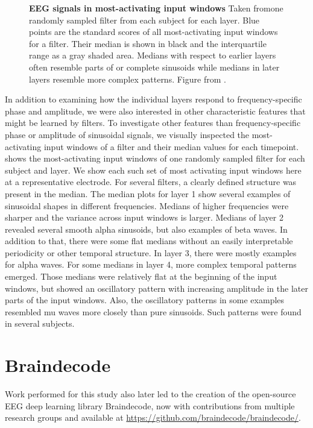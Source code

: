 \begin{figure}[htb]
    \caption[EEG signals in most-activating windows. per-electrode class prototypes]{
\textbf{EEG signals in most-activating input windows} Taken fromone randomly
sampled filter from each subject for each layer. Blue points are the
standard scores of all most-activating input windows for a filter. Their
median is shown in black and the interquartile range as a gray shaded
area. Medians with respect to earlier layers often resemble parts of or
complete sinusoids while medians in later layers resemble more complex
patterns. Figure from \citet{hartmann2018hierarchical}. 
    }\label{maximally-activating-units-fig}
\end{figure}



    In addition to examining how the individual layers respond to
frequency-specific phase and amplitude, we were also interested in other
characteristic features that might be learned by filters. To investigate
other features than frequency-specific phase or amplitude of sinusoidal
signals, we visually inspected the most-activating input windows of a
filter and their median values for each timepoint.
 shows the
most-activating input windows of one randomly sampled filter for each
subject and layer. We show each such set of most activating input
windows here at a representative electrode.
% 
For several filters, a clearly defined structure was present in the
median. The median plots for layer 1 show several examples of sinusoidal
shapes in different frequencies. Medians of higher frequencies were
sharper and the variance across input windows is larger. Medians of
layer 2 revealed several smooth alpha sinusoids, but also examples of
beta waves. In addition to that, there were some flat medians without an
easily interpretable periodicity or other temporal structure. In layer
3, there were mostly examples for alpha waves. For some medians in layer
4, more complex temporal patterns emerged. Those medians were relatively
flat at the beginning of the input windows, but showed an oscillatory
pattern with increasing amplitude in the later parts of the input
windows. Also, the oscillatory patterns in some examples resembled mu
waves more closely than pure sinusoids. Such patterns were found in
several subjects.

\section{Braindecode}\label{braindecode}

Work performed for this study also later led to the creation of the
open-source EEG deep learning library Braindecode, now with
contributions from multiple research groups and available at
\url{https://github.com/braindecode/braindecode/}.
